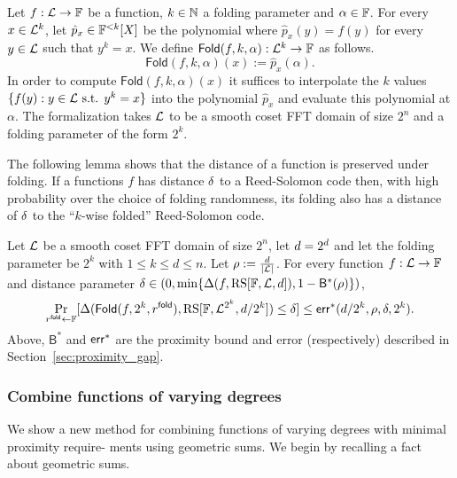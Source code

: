 \begin{definition}\label{def:fn_folding}
\leanok
Let $f:\mathcal{L}\rightarrow\mathbb{F}$ be a function, $k\in\mathbb{N}$ a folding parameter and $\alpha\in\mathbb{F}$. For every $x\in{\mathcal{L}}^k$, let $\hat{p}_x\in\mathbb{F}^{<k}[X]$ be the polynomial where $\hat{p}_x(y)=f(y)$ for every $y\in{\mathcal{L}}$ such that $y^k=x$. We define $\mathsf{Fold}(f,k,\alpha):{\mathcal{L}}^k\rightarrow\mathbb{F}$ as follows.
\[
    \mathsf{Fold}(f,k,\alpha)(x):=\hat{p}_x(\alpha).
\]
In order to compute $\mathsf{Fold}(f,k,\alpha)(x)$ it suffices to interpolate the $k$ values $\{f(y):y\in\mathcal{L}\text{ s.t. }y^k=x\}$ into the polynomial $\hat{p}_x$ and evaluate this polynomial at $\alpha$.
The formalization takes $\mathcal{L}$ to be a smooth coset FFT domain of size $2^n$ and a folding
parameter of the form $2^k$.
\end{definition}

The following lemma shows that the distance of a function is preserved under folding. If a functions $f$ has distance $\delta$ to a Reed-Solomon code then, with high probability over the choice of folding randomness, its folding also has a distance of $\delta$ to the ``$k$-wise folded'' Reed-Solomon code.

\begin{lemma}\label{lemma:folding}
\leanok
{}
    Let $\mathcal{L}$ be a smooth coset FFT domain of size $2^n$, let $d=2^{d}$ and let the
    folding parameter be $2^{k}$ with $1\le k\le d\le n$. Let $\rho:=\frac{d}{|\mathcal{L}|}$.
    For every function $f:\mathcal{L}\rightarrow\mathbb{F}$ and distance parameter
    $\delta\in(0,\min\{\Delta(f,\mathrm{RS}[\mathbb{F},\mathcal{L},d]),1-{\mathsf{B}}^*(\rho)\})$,
    \[
        \Pr_{r^{\mathsf{fold}}\gets\mathbb{F}}[\Delta(\mathsf{Fold}(f,2^k,r^{\mathsf{fold}}),\mathrm{RS}[\mathbb{F},{\mathcal{L}}^{2^k}, d/2^k])\le\delta]\le\mathsf{err}^*(d/2^k,\rho,\delta,2^k).
    \]
    Above, ${\mathsf{B}}^*$ and ${\mathsf{err}}^*$ are the proximity bound and error (respectively) described in Section~\ref{sec:proximity_gap}.
\end{lemma}

\subsubsection{Combine functions of varying degrees}\label{sec:combine}
We show a new method for combining functions of varying degrees with minimal proximity require- ments using geometric sums. We begin by recalling a fact about geometric sums.

